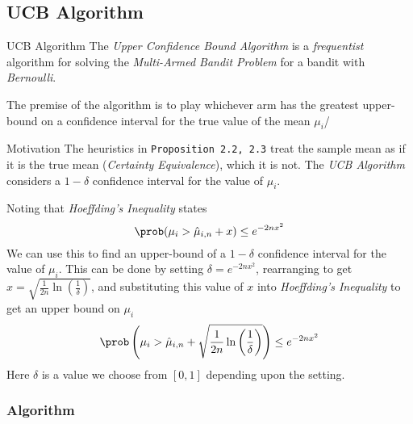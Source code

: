 \documentclass[11pt,a4paper]{article}
\begin{document}
\subsection{UCB Algorithm}

  \begin{remark}{UCB Algorithm}
    The \textit{Upper Confidence Bound Algorithm} is a \textit{frequentist} algorithm for solving the \textit{Multi-Armed Bandit Problem} for a bandit with \textit{Bernoulli}.
    \par The premise of the algorithm is to play whichever arm has the greatest upper-bound on a confidence interval for the true value of the mean $\mu_i$/
  \end{remark}

  \begin{remark}{Motivation}
    The heuristics in \texttt{Proposition 2.2, 2.3}  treat the sample mean as if it is the true mean (\textit{Certainty Equivalence}), which it is not. The \textit{UCB Algorithm} considers a $1-\delta$ confidence interval for the value of $\mu_i$.
    \par Noting that \textit{Hoeffding's Inequality} states
    \[ \prob(\mu_i>\hat\mu_{i,n}+x)\leq e^{-2nx^2} \]
    We can use this to find an upper-bound of a $1-\delta$ confidence interval for the value of $\mu_i$. This can be done by setting $\delta=e^{-2nx^2}$, rearranging to get $x=\sqrt{\frac1{2n}\ln\left(\frac1\delta\right)}$, and substituting this value of $x$ into \textit{Hoeffding's Inequality} to get an upper bound on $\mu_i$
    \[ \prob\left(\mu_i>\hat\mu_{i,n}+\sqrt{\frac1{2n}\ln\left(\frac1\delta\right)}\right)\leq e^{-2nx^2} \]
    Here $\delta$ is a value we choose from $[0,1]$ depending upon the setting.
  \end{remark}

\subsubsection{Algorithm}
\end{document}
